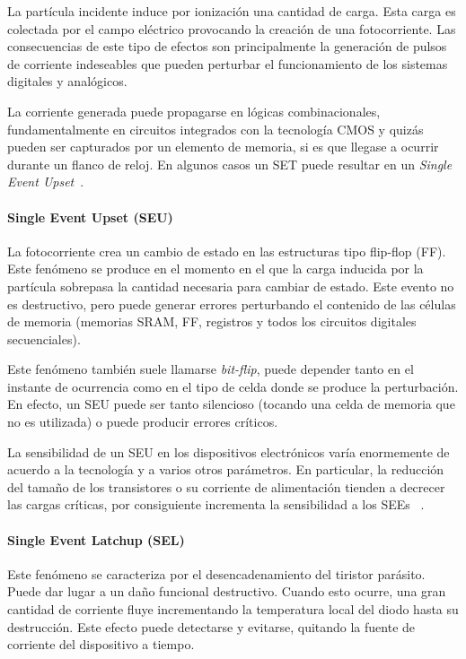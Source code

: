 \documentclass[a4paper,openright,12pt]{report}
\begin{document}
La partícula incidente induce por ionización una cantidad de carga. Esta carga es colectada por el campo eléctrico provocando la creación de una fotocorriente. Las consecuencias de este tipo de efectos son principalmente la generación de pulsos de corriente indeseables que pueden perturbar el funcionamiento de los sistemas digitales y analógicos.

La corriente generada puede propagarse en lógicas combinacionales, 
 fundamentalmente en circuitos integrados con la tecnología CMOS y quizás pueden ser capturados por un elemento de memoria, si es que llegase a ocurrir durante un flanco de reloj. En algunos casos un SET puede resultar en un \textit{Single Event Upset}~\cite{ grandstrand:2004}. 

\paragraph{Single Event Upset (SEU) } \hfill \break

La fotocorriente crea un cambio de estado en las estructuras tipo flip-flop (FF). Este fenómeno se produce en el momento en el que la carga inducida por la partícula sobrepasa la cantidad necesaria para cambiar de estado. Este evento no es destructivo, pero puede generar errores perturbando el contenido de las células de memoria (memorias SRAM, FF, registros y todos los circuitos digitales secuenciales).

Este fenómeno también suele llamarse \textit{bit-flip}, puede depender tanto en el instante de ocurrencia como en el tipo de celda donde se produce la perturbación. En efecto, un SEU puede ser tanto silencioso (tocando una celda de memoria que no es utilizada) o puede producir errores críticos.

La sensibilidad de un SEU en los dispositivos electrónicos varía enormemente de acuerdo a la tecnología y a varios otros parámetros. En particular, la reducción del tamaño de los transistores o su corriente de alimentación tienden a decrecer las cargas críticas, por consiguiente incrementa la sensibilidad a los SEEs ~\cite{ grandstrand:2004}.


\paragraph{Single Event Latchup (SEL) } \hfill \break

Este fenómeno se caracteriza por el desencadenamiento del tiristor parásito. Puede dar lugar a un daño funcional destructivo. Cuando esto ocurre, una gran cantidad de corriente fluye incrementando la temperatura local del diodo hasta su destrucción. Este efecto puede detectarse y evitarse, quitando la fuente de corriente del dispositivo a tiempo.
\end{document}
